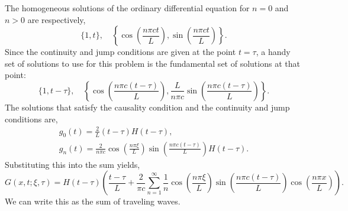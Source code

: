 {\begin{Solution}
  The homogeneous solutions of the ordinary differential equation for 
  $n = 0$ and $n > 0$ are respectively,
  \[
  \{ 1, t \}, \quad
  \left\{ \cos \left( \frac{n \pi c t}{L} \right), 
    \sin \left( \frac{n \pi c t}{L} \right) \right\}.
  \]
  Since the continuity and jump conditions are given at the point $t = \tau$,
  a handy set of solutions to use for this problem is the fundamental set of
  solutions at that point:
  \[
  \{ 1, t - \tau \}, \quad
  \left\{ \cos \left( \frac{n \pi c (t - \tau)}{L} \right), 
    \frac{L}{n \pi c} \sin \left( \frac{n \pi c (t - \tau)}{L} \right) \right\}.
  \]
  The solutions that satisfy the causality condition and the continuity and 
  jump conditions are,
  \begin{gather*}
    g_0(t) = \frac{2}{L} (t - \tau) H(t - \tau), \\
    g_n(t) = \frac{2}{n \pi c} \cos \left( \frac{n \pi \xi}{L} \right)
    \sin \left( \frac{n \pi c(t - \tau)}{L} \right) H(t - \tau).
  \end{gather*}
  Substituting this into the sum yields,
  \[
  G(x, t; \xi, \tau) = H(t - \tau) \left( \frac{t - \tau}{L} + \frac{2}{\pi c}
    \sum_{n = 1}^\infty \frac{1}{n} \cos \left( \frac{n \pi \xi}{L} \right)
    \sin \left( \frac{n \pi c(t - \tau)}{L} \right) 
    \cos \left( \frac{n \pi x}{L} \right) \right).
  \]
  We can write this as the sum of traveling waves.

  \begin{center}
  \end{center}
\end{Solution}












}
